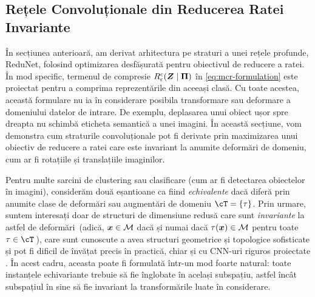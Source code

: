 \documentclass[../../book-main_ro.tex]{subfiles}
\begin{document}
\subsection{Rețele Convoluționale din Reducerea Ratei Invariante}\label{sec:shift-invariant}

În secțiunea anterioară, am derivat arhitectura pe straturi a unei rețele profunde, ReduNet, folosind optimizarea desfășurată pentru obiectivul de reducere a ratei. 
În mod specific, termenul de compresie $R^c_\epsilon(\bm{Z} \mid\bm \Pi)$ în \eqref{eq:mcr-formulation} este proiectat pentru a comprima reprezentările din aceeași clasă. Cu toate acestea, această formulare nu ia în considerare posibila transformare sau deformare a domeniului datelor de intrare. De exemplu, deplasarea unui obiect ușor spre dreapta nu schimbă eticheta semantică a unei imagini. În această secțiune, vom demonstra cum straturile convoluționale pot fi derivate prin maximizarea unui obiectiv de reducere a ratei care este invariant la anumite deformări de domeniu, cum ar fi rotațiile și translațiile imaginilor. 


Pentru multe sarcini de clustering sau clasificare (cum ar fi detectarea obiectelor în imagini), considerăm două eșantioane ca fiind {\em echivalente} dacă diferă prin anumite clase de deformări sau augmentări de domeniu $\cT = \{\tau \}$. Prin urmare, suntem interesați doar de structuri de dimensiune redusă care sunt {\em invariante} la astfel de deformări~(adică, $\bm{x} \in \mathcal{M}$ dacă și numai dacă $\tau(\bm{x}) \in \mathcal{M}$ pentru toate $\tau \in \cT$\,), 
care sunt cunoscute a avea structuri geometrice și topologice sofisticate și pot fi dificil de învățat precis în practică, chiar și cu CNN-uri riguros proiectate \cite{Cohen-ICML-2016}. 
În acest cadru, aceasta poate fi formulată într-un mod foarte natural: toate instanțele echivariante trebuie să fie înglobate în același subspațiu, astfel încât subspațiul în sine să fie invariant la transformările luate în considerare.
\end{document}

